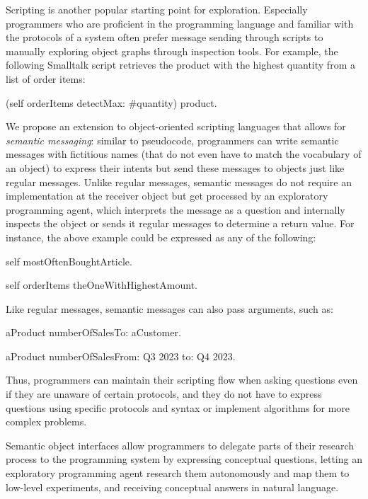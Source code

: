 Scripting is another popular starting point for exploration.
Especially programmers who are proficient in the programming language and familiar with the protocols of a system often prefer message sending through scripts to manually exploring object graphs through inspection tools.
For example, the following Smalltalk script retrieves the product with the highest quantity from a list of order items:

\begin{multicode}
	(self orderItems detectMax: \#quantity) product.
\end{multicode}

We propose an extension to object-oriented scripting languages that allows for \emph{semantic messaging}: similar to pseudocode, programmers can write semantic messages with fictitious names (that do not even have to match the vocabulary of an object) to express their intents but send these messages to objects just like regular messages.
Unlike regular messages, semantic messages do not require an implementation at the receiver object but get processed by an exploratory programming agent, which interprets the message as a question and internally inspects the object or sends it regular messages to determine a return value.
For instance, the above example could be expressed as any of the following:
\begin{multicode}
	self mostOftenBoughtArticle.

	self orderItems theOneWithHighestAmount.
\end{multicode}
Like regular messages, semantic messages can also pass arguments, such as:
\begin{multicode}
	aProduct numberOfSalesTo: aCustomer.

	aProduct numberOfSalesFrom: \textquotesingle Q3 2023\textquotesingle{} to: \textquotesingle Q4 2023\textquotesingle.
\end{multicode}

\noindent
Thus, programmers can maintain their scripting flow when asking questions even if they are unaware of certain protocols, and they do not have to express questions using specific protocols and syntax or implement algorithms for more complex problems.

\ParSep

Semantic object interfaces allow programmers to delegate parts of their research process to the programming system by expressing conceptual questions, letting an exploratory programming agent research them autonomously and map them to low-level experiments, and receiving conceptual answers in natural language.
